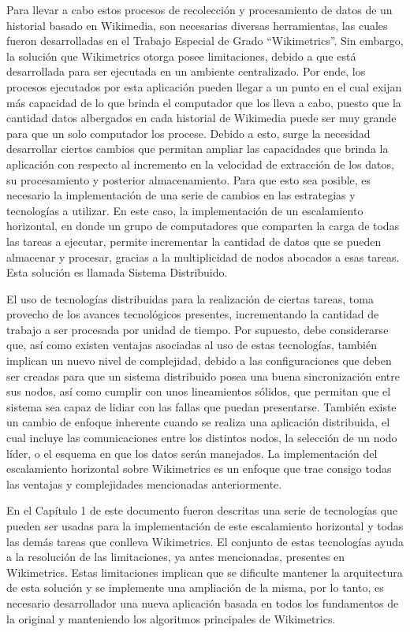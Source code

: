 Para llevar a cabo estos procesos de recolección y procesamiento de datos de un
historial basado en Wikimedia, son necesarias diversas herramientas, las cuales fueron
desarrolladas en el Trabajo Especial de Grado “Wikimetrics”. Sin embargo, la solución
que Wikimetrics otorga posee limitaciones, debido a que está desarrollada para ser
ejecutada en un ambiente centralizado. Por ende, los procesos ejecutados por esta
aplicación pueden llegar a un punto en el cual exijan más capacidad de lo que brinda el
computador que los lleva a cabo, puesto que la cantidad datos albergados en cada
historial de Wikimedia puede ser muy grande para que un solo computador los procese.
Debido a esto, surge la necesidad desarrollar ciertos cambios que permitan ampliar
las capacidades que brinda la aplicación con respecto al incremento en la velocidad de
extracción de los datos, su procesamiento y posterior almacenamiento. Para que esto
sea posible, es necesario la implementación de una serie de cambios en las estrategias y
tecnologías a utilizar. En este caso, la implementación de un escalamiento horizontal, en
donde un grupo de computadores que comparten la carga de todas las tareas a ejecutar,
permite incrementar la cantidad de datos que se pueden almacenar y procesar, gracias a
la multiplicidad de nodos abocados a esas tareas. Esta solución es llamada Sistema
Distribuido.

El uso de tecnologías distribuidas para la realización de ciertas tareas, toma provecho
de los avances tecnológicos presentes, incrementando la cantidad de trabajo a ser
procesada por unidad de tiempo. Por supuesto, debe considerarse que, así como existen
ventajas asociadas al uso de estas tecnologías, también implican un nuevo nivel de
complejidad, debido a las configuraciones que deben ser creadas para que un sistema
distribuido posea una buena sincronización entre sus nodos, así como cumplir con unos
lineamientos sólidos, que permitan que el sistema sea capaz de lidiar con las fallas que
puedan presentarse. También existe un cambio de enfoque inherente cuando se realiza
una aplicación distribuida, el cual incluye las comunicaciones entre los distintos nodos,
la selección de un nodo líder, o el esquema en que los datos serán manejados. La
implementación del escalamiento horizontal sobre Wikimetrics es un enfoque que trae
consigo todas las ventajas y complejidades mencionadas anteriormente.

En el Capítulo 1 de este documento fueron descritas una serie de tecnologías que
pueden ser usadas para la implementación de este escalamiento horizontal y todas las
demás tareas que conlleva Wikimetrics. El conjunto de estas tecnologías ayuda a la
resolución de las limitaciones, ya antes mencionadas, presentes en Wikimetrics. Estas
limitaciones implican que se dificulte mantener la arquitectura de esta solución y se
implemente una ampliación de la misma, por lo tanto, es necesario desarrollador una
nueva aplicación basada en todos los fundamentos de la original y manteniendo los
algoritmos principales de Wikimetrics.


